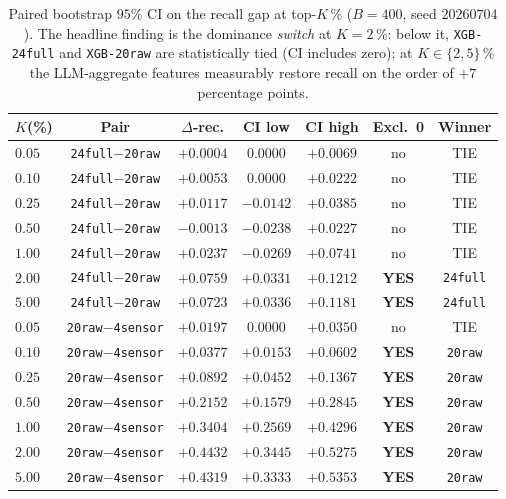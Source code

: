 \documentclass{article}
\begin{document}
\begin{table}[t]
\centering
\small
\caption{Paired bootstrap $95\%$ CI on the recall gap at top-$K$\,\%
($B{=}400$, seed $20260704$). The headline finding is the dominance
\emph{switch} at $K{=}2$\,\%: below it, \texttt{XGB-24full} and
\texttt{XGB-20raw} are statistically tied (CI includes zero); at
$K{\in}\{2,5\}\,\%$ the LLM-aggregate features measurably restore recall
on the order of $+7$ percentage points.}
\label{tab:p8-alert-volume-boot}
\begin{tabular}{lcccccc}
\toprule
$K$(\%) & Pair & $\Delta$-rec. & CI low & CI high & Excl.\ 0 & Winner \\
\midrule
$0.05$ & \texttt{24full}${-}$\texttt{20raw}  & $+0.0004$ & $0.0000$ & $+0.0069$ & no  & TIE \\
$0.10$ & \texttt{24full}${-}$\texttt{20raw}  & $+0.0053$ & $0.0000$ & $+0.0222$ & no  & TIE \\
$0.25$ & \texttt{24full}${-}$\texttt{20raw}  & $+0.0117$ & $-0.0142$ & $+0.0385$ & no & TIE \\
$0.50$ & \texttt{24full}${-}$\texttt{20raw}  & $-0.0013$ & $-0.0238$ & $+0.0227$ & no & TIE \\
$1.00$ & \texttt{24full}${-}$\texttt{20raw}  & $+0.0237$ & $-0.0269$ & $+0.0741$ & no & TIE \\
$2.00$ & \texttt{24full}${-}$\texttt{20raw}  & $+0.0759$ & $+0.0331$ & $+0.1212$ & \textbf{YES} & \texttt{24full} \\
$5.00$ & \texttt{24full}${-}$\texttt{20raw}  & $+0.0723$ & $+0.0336$ & $+0.1181$ & \textbf{YES} & \texttt{24full} \\
\midrule
$0.05$ & \texttt{20raw}${-}$\texttt{4sensor}  & $+0.0197$ & $0.0000$ & $+0.0350$ & no  & TIE \\
$0.10$ & \texttt{20raw}${-}$\texttt{4sensor}  & $+0.0377$ & $+0.0153$ & $+0.0602$ & \textbf{YES} & \texttt{20raw} \\
$0.25$ & \texttt{20raw}${-}$\texttt{4sensor}  & $+0.0892$ & $+0.0452$ & $+0.1367$ & \textbf{YES} & \texttt{20raw} \\
$0.50$ & \texttt{20raw}${-}$\texttt{4sensor}  & $+0.2152$ & $+0.1579$ & $+0.2845$ & \textbf{YES} & \texttt{20raw} \\
$1.00$ & \texttt{20raw}${-}$\texttt{4sensor}  & $+0.3404$ & $+0.2569$ & $+0.4296$ & \textbf{YES} & \texttt{20raw} \\
$2.00$ & \texttt{20raw}${-}$\texttt{4sensor}  & $+0.4432$ & $+0.3445$ & $+0.5275$ & \textbf{YES} & \texttt{20raw} \\
$5.00$ & \texttt{20raw}${-}$\texttt{4sensor}  & $+0.4319$ & $+0.3333$ & $+0.5353$ & \textbf{YES} & \texttt{20raw} \\
\bottomrule
\end{tabular}
\end{table}
\end{document}
